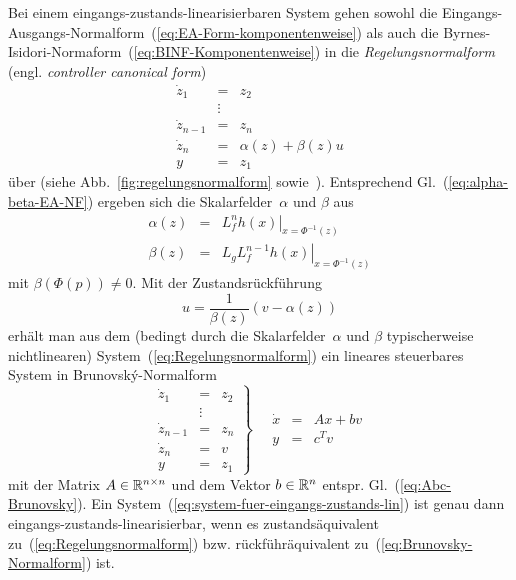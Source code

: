 Bei einem eingangs-zustands-linearisierbaren System gehen sowohl die
Eingangs-Ausgangs-Normalform~(\ref{eq:EA-Form-komponentenweise})
als auch die Byrnes-Isidori-Normaform~(\ref{eq:BINF-Komponentenweise})
in die \emph{Regelungsnormalform}
(engl. \emph{controller canonical form}) 
\begin{equation}
\begin{array}{lcl}
\dot{z}_{1} & = & z_{2}\\
 & \vdots\\
\dot{z}_{n-1} & = & z_{n}\\
\dot{z}_{n} & = & \alpha(z)+\beta(z)u\\
y & = & z_{1}
\end{array}\label{eq:Regelungsnormalform}
\end{equation}
 über (siehe Abb.~\ref{fig:regelungsnormalform} sowie~\cite{zeitz85,zeitz89}).
Entsprechend Gl.~(\ref{eq:alpha-beta-EA-NF}) ergeben sich die Skalarfelder~$\alpha$
und $\beta$ aus 
\begin{equation}
\begin{array}{lcl}
\alpha(z) & = & \left.L_{f}^{n}h(x)\right|_{x=\Phi^{-1}(z)}\\
\beta(z) & = & \left.L_{g}L_{f}^{n-1}h(x)\right|_{x=\Phi^{-1}(z)}
\end{array}\label{eq:alpha-beta-EZ-Regelungs-NF}
\end{equation}
mit $\beta(\Phi(p))\neq0$. Mit der Zustandsrückführung
\begin{equation}
u=\frac{1}{\beta(z)}\left(v-\alpha(z)\right)\label{eq:rueckfuehrung-EZ}
\end{equation}
erhält man aus dem (bedingt durch die Skalarfelder~$\alpha$ und
$\beta$ typischerweise nichtlinearen) System~(\ref{eq:Regelungsnormalform})
ein lineares steuerbares System in Brunovský-Normalform~\cite{brunovsky70}
\begin{equation}
\left.\begin{array}{lcl}
\dot{z}_{1} & = & z_{2}\\
 & \vdots\\
\dot{z}_{n-1} & = & z_{n}\\
\dot{z}_{n} & = & v\\
y & = & z_{1}
\end{array}\right\} \quad\begin{array}{ccl}
\dot{x} & = & Ax+bv\\
y & = & c^{T}v
\end{array}\label{eq:Brunovsky-Normalform}
\end{equation}
mit der Matrix $A\in{\mathbb{R}}^{n\times n}$ und dem Vektor \textbf{$b\in{\mathbb{R}}^{n}$}
entspr. Gl.~(\ref{eq:Abc-Brunovsky}). Ein System~(\ref{eq:system-fuer-eingangs-zustands-lin})
ist genau dann eingangs-zustands-linearisierbar, wenn es zustands\-äquivalent
zu~(\ref{eq:Regelungsnormalform}) bzw. rück\-führ\-äquivalent
zu~(\ref{eq:Brunovsky-Normalform}) ist.

